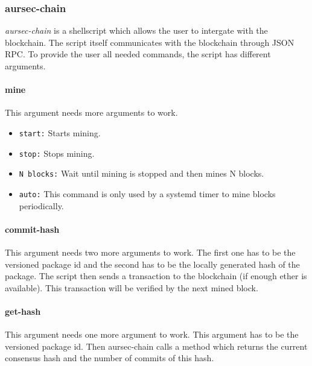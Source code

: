  \subsubsection{aursec-chain}\label{sec:aursec-chain}
\emph{aursec-chain} is a shellscript which allows the user to intergate with the blockchain. The script itself communicates with the blockchain through JSON RPC. To provide the user all needed commands, the script has different arguments.

\paragraph*{mine}
This argument needs more arguments to work.
\begin{itemize}
	\item \texttt{start:} Starts mining.
	\item \texttt{stop:} Stops mining.
	\item \texttt{N blocks:} Wait until mining is stopped and then mines N blocks.
	\item \texttt{auto:} This command is only used by a systemd timer to mine blocks periodically.
\end{itemize}

\paragraph*{commit-hash}
This argument needs two more arguments to work. The first one has to be the versioned package id and the second has to be the locally generated hash of the package. The script then sends a transaction to the blockchain (if enough ether is available). This transaction will be verified by the next mined block.

\paragraph*{get-hash}
This argument needs one more argument to work. This argument has to be the versioned package id. Then aursec-chain calls a method which returns the current consensus hash and the number of commits of this hash. 
